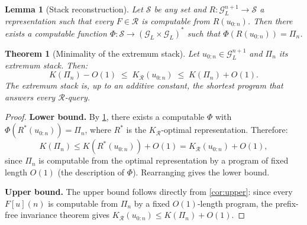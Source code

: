 \documentclass[10pt,a4paper]{amsart}
\newtheorem{lemma}{Lemma}
\newtheorem{theorem}{Theorem}
\newcommand{\GL}{\mathcal{G}_L}
\newcommand{\R}{\mathcal{R}}
\newcommand{\stack}{\Pi}
\begin{document}
\begin{lemma}[Stack reconstruction]
\label{lem:recon}
Let $\mathcal{S}$ be any set and
$R: \GL^{n+1} \to \mathcal{S}$ a representation such that
every $F \in \R$ is computable from $R(u_{0:n})$.
Then there exists a computable function
$\Phi: \mathcal{S} \to (\GL \times \GL)^*$
such that $\Phi(R(u_{0:n})) = \stack_n$.
\end{lemma}

\begin{theorem}[Minimality of the extremum stack]
\label{thm:main}
Let $u_{0:n} \in \GL^{n+1}$ and $\stack_n$ its extremum stack.
Then:
\begin{equation}
  K(\stack_n) - O(1)
  \;\leq\; K_{\R}(u_{0:n})
  \;\leq\; K(\stack_n) + O(1).
  \label{eq:main}
\end{equation}
The extremum stack is, up to an additive constant, the
shortest program that answers every $\R$-query.
\end{theorem}

\begin{proof}
\textbf{Lower bound.}
By \cref{lem:recon}, there exists a computable $\Phi$ with
$\Phi(R^*(u_{0:n})) = \stack_n$, where $R^*$ is the
$K_{\R}$-optimal representation.
Therefore:
\[
  K(\stack_n) \leq K(R^*(u_{0:n})) + O(1) = K_{\R}(u_{0:n}) + O(1),
\]
since $\stack_n$ is computable from the optimal representation
by a program of fixed length $O(1)$ (the description of $\Phi$).
Rearranging gives the lower bound.

\textbf{Upper bound.}
The upper bound follows directly from \cref{cor:upper}:
since every $F[u](n)$ is computable from $\stack_n$ by a fixed
$O(1)$-length program, the prefix-free invariance theorem gives
$K_{\R}(u_{0:n}) \leq K(\stack_n) + O(1)$.
\end{proof}
\end{document}

